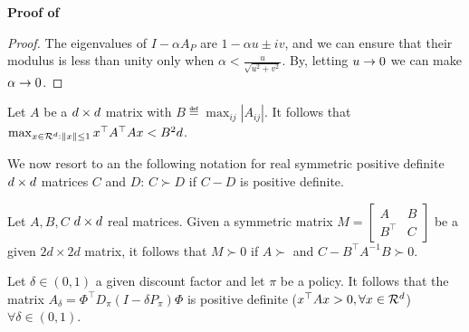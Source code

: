 \textbf{Proof of }
\begin{proof}
The eigenvalues of $I-\alpha A_P$ are $1-\alpha u\pm i v$, and we can ensure that their modulus is less than unity only when $\alpha<\frac{u}{\sqrt{u^2+v^2}}$. By, letting $u\rightarrow 0$ we can make $\alpha\rightarrow 0$.
\end{proof}

\begin{lemma}\label{lm:matnorm}
Let $A$ be a $d \times d$ matrix with $B\eqdef\max_{ij}\left|A_{ij}\right|$. It follows that $\max_{x\in \mathcal{R}^d: \left\| x\right\|\leq1}x^\top A^\top A x <B^2d$.
\end{lemma}

We now resort to an the following notation for real symmetric positive definite $d \times d$ matrices $C$ and $D$: $C\succ D$ if $C-D$ is positive definite.
\begin{lemma}\label{lm:schur}
Let $A,B,C$ $d \times d$ real matrices. Given a symmetric matrix $M=\left[\begin{matrix}A&B \\B^\top &C\end{matrix}\right]$ be a given $2d\times 2d$ matrix, it follows that $M\succ 0$ if	$A\succ$ and $C-B^\top A^{-1}B\succ 0$.
\end{lemma}

\begin{lemma}\label{lm:amat}
Let $\delta\in(0,1)$ a given discount factor and let $\pi$ be a policy. It follows that the matrix $A_\delta=\Phi^\top D_\pi(I-\delta P_\pi)\Phi$ is positive definite ($x^\top Ax>0,\forall x \in \mathcal{R}^d$) $\forall \delta\in(0,1)$.
\end{lemma}

